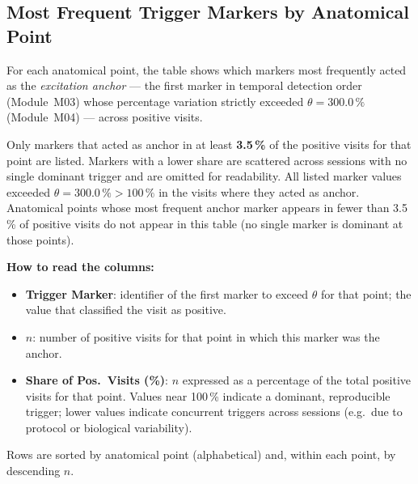 \documentclass[a4paper,11pt]{article}
\begin{document}
\subsection{Most Frequent Trigger Markers by Anatomical Point}

For each anatomical point, the table shows which markers most frequently acted as the
\emph{excitation anchor} --- the first marker in temporal detection order (Module~M03)
whose percentage variation strictly exceeded $\theta = 300.0\,\%$
(Module~M04) --- across positive visits.

\medskip
Only markers that acted as anchor in at least \textbf{3.5\,\%}
of the positive visits for that point are listed.
Markers with a lower share are scattered across sessions with no single dominant trigger
and are omitted for readability.
All listed marker values exceeded $\theta = 300.0\,\% > 100\,\%$ in the
visits where they acted as anchor.
Anatomical points whose most frequent anchor marker appears in fewer than
3.5\,\% of positive visits do not appear in this table (no single
marker is dominant at those points).

\medskip
\noindent\textbf{How to read the columns:}
\begin{itemize}
  \item \textbf{Trigger Marker}: identifier of the first marker to exceed $\theta$ for
        that point; the value that classified the visit as positive.
  \item \textbf{$n$}: number of positive visits for that point in which this marker was
        the anchor.
  \item \textbf{Share of Pos.\ Visits (\%)}: $n$ expressed as a percentage of the total
        positive visits for that point.
        Values near 100\,\% indicate a dominant, reproducible trigger;
        lower values indicate concurrent triggers across sessions (e.g.\ due to
        protocol or biological variability).
\end{itemize}

\medskip
\noindent Rows are sorted by anatomical point (alphabetical) and, within each point, by
descending $n$.
\end{document}
